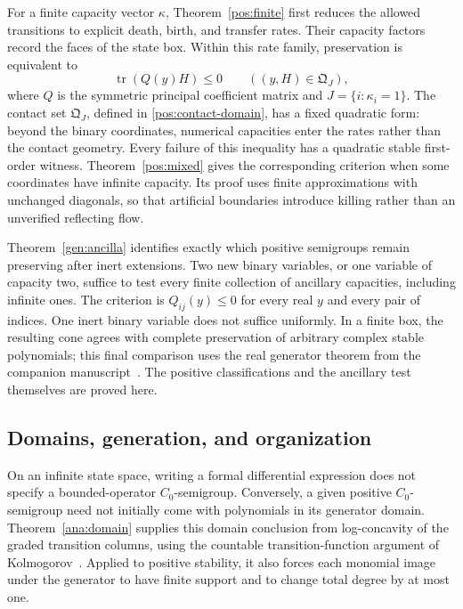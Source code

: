 \documentclass[reqno]{amsart}
\theoremstyle{definition}
\theoremstyle{remark}
\begin{document}
For a finite capacity vector \(\kappa\), Theorem~\ref{pos:finite}
first reduces the allowed transitions to explicit death, birth, and
transfer rates. Their capacity factors record the faces of the state
box. Within this rate family, preservation is equivalent to
\[
 \operatorname{tr}(Q(y)H)\le0
 \qquad ((y,H)\in\mathfrak Q_J),
\]
where \(Q\) is the symmetric principal coefficient matrix and
\(J=\{i:\kappa_i=1\}\). The contact set \(\mathfrak Q_J\), defined
in \eqref{pos:contact-domain}, has a fixed quadratic form: beyond the
binary coordinates, numerical capacities enter the rates rather than
the contact geometry. Every failure of this inequality has a quadratic
stable first-order witness. Theorem~\ref{pos:mixed} gives the corresponding
criterion when some coordinates have infinite capacity. Its proof uses
finite approximations with unchanged diagonals, so that artificial
boundaries introduce killing rather than an unverified reflecting flow.

Theorem~\ref{gen:ancilla} identifies exactly which positive semigroups
remain preserving after inert extensions. Two new binary variables, or
one variable of capacity two, suffice to test every finite collection
of ancillary capacities, including infinite ones. The criterion is
\(Q_{ij}(y)\le0\) for every real \(y\) and every pair of indices.
One inert binary variable does not suffice uniformly. In a finite box,
the resulting cone agrees with complete preservation of arbitrary
complex stable polynomials; this final comparison uses the real
generator theorem from the companion manuscript~\cite{WeiGenerators2026}.
The positive classifications and the ancillary test themselves are
proved here.

\subsection{Domains, generation, and organization}

On an infinite state space, writing a formal differential expression
does not specify a bounded-operator \(C_0\)-semigroup. Conversely, a
given positive \(C_0\)-semigroup need not initially come with
polynomials in its generator domain. Theorem~\ref{ana:domain} supplies
this domain conclusion from log-concavity of the graded transition
columns, using the countable transition-function argument of
Kolmogorov~\cite{Chung67,Kendall55}. Applied to positive stability,
it also forces each monomial image under the generator to have finite
support and to change total degree by at most one.
\end{document}
